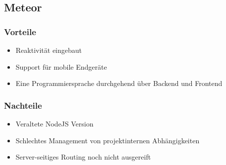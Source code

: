 \subsection{Meteor}
\label{ssec:el-meteor}

\subsubsection{Vorteile}
\label{sssec:elm-vorteile}

\begin{itemize}
	\item Reaktivität eingebaut
	\item Support für mobile Endgeräte
	\item Eine Programmiersprache durchgehend über Backend und Frontend
\end{itemize}

\subsubsection{Nachteile}
\label{sssec:elm-nachteile}

\begin{itemize}
	\item Veraltete NodeJS Version
	\item Schlechtes Management von projektinternen Abhängigkeiten
	\item Server-seitiges Routing noch nicht ausgereift
\end{itemize}
